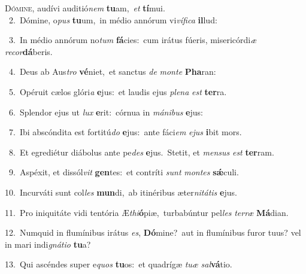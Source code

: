 \lettrine{\initial\textcolor{\initialcolor}{D}}{ómine,} audívi auditió\textit{nem} \textbf{tu}\-am,~\star \textit{et} \textbf{tí}\-mui.\\
{\numbfont\textcolor{\numbcolor}{~2.}}~Dómine, o\textit{pus} \textbf{tu}\-um,~\star in médio annórum vi\-\textit{ví}\-\textit{fi}\textit{ca} \textbf{il}\-lud:\par
{\numbfont\textcolor{\numbcolor}{~3.}}~In médio annórum no\textit{tum} \textbf{fá}\-cies:~\star cum irátus fúeris, misericórdi\textit{æ} \textit{re}\-\textit{cor}\textbf{dá}beris.\par
{\numbfont\textcolor{\numbcolor}{~4.}}~Deus ab Aus\textit{tro} \textbf{vé}\-niet,~\star et sanctus \textit{de} \textit{mon}\-\textit{te} \textbf{Pha}\-ran:\par
{\numbfont\textcolor{\numbcolor}{~5.}}~Opéruit cælos glóri\textit{a} \textbf{e}\-jus:~\star et laudis ejus \textit{ple}\-\textit{na} \textit{est} \textbf{ter}\-ra.\par
{\numbfont\textcolor{\numbcolor}{~6.}}~Splendor ejus ut \textit{lux} \textbf{e}\-rit:~\star córnua in \textit{má}\-\textit{ni}\textit{bus} \textbf{e}\-jus:\par
{\numbfont\textcolor{\numbcolor}{~7.}}~Ibi abscóndita est fortitú\textit{do} \textbf{e}\-jus:~\star ante fáci\textit{em} \textit{e}\-\textit{jus} \textbf{i}\-bit mors.\par
{\numbfont\textcolor{\numbcolor}{~8.}}~Et egrediétur diábolus ante pe\textit{des} \textbf{e}\-jus.~\star Stetit, et \textit{men}\-\textit{sus} \textit{est} \textbf{ter}\-ram.\par
{\numbfont\textcolor{\numbcolor}{~9.}}~Aspéxit, et dissól\textit{vit} \textbf{gen}\-tes:~\star et contríti \textit{sunt} \textit{mon}\-\textit{tes} \textbf{sǽ}\-culi.\par
{\numbfont\textcolor{\numbcolor}{10.}}~Incurváti sunt col\textit{les} \textbf{mun}\-di,~\star ab itinéribus æter\-\textit{ni}\-\textit{tá}\textit{tis} \textbf{e}\-jus.\par
{\numbfont\textcolor{\numbcolor}{11.}}~Pro iniquitáte vidi tentória Æ\-\textit{thi}\-\textbf{ó}piæ,~\star turbabúntur pel\textit{les} \textit{ter}\-\textit{ræ} \textbf{Má}\-dian.\par
{\numbfont\textcolor{\numbcolor}{12.}}~Numquid in flumínibus irátus \textit{es}\-, \textbf{Dó}\-mine?~\star aut in flumínibus furor tuus? vel in mari indi\-\textit{gná}\-\textit{ti}\textit{o} \textbf{tu}\-a?\par
{\numbfont\textcolor{\numbcolor}{13.}}~Qui ascéndes super e\textit{quos} \textbf{tu}\-os:~\star et quadrígæ \textit{tu}\-\textit{æ} \textit{sal}\-\textbf{vá}tio.\par

